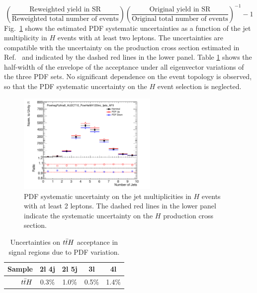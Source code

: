 \begin{equation} \label{equation:systematics_PDFunc}
\left(\frac{\textrm{Reweighted yield in SR}}{\textrm{Reweighted total number of events}}\right)\left(\frac{\textrm{Original yield in SR}}{\textrm{Original total number of events}}\right)^{-1}-1
\end{equation}
Fig.~\ref{figure:systematics_theosystPDF} shows the estimated PDF systematic uncertainties as a function of the jet multiplicity in \ttbar$H$ events with at least two leptons. The uncertainties are compatible with the uncertainty on the production cross section estimated in Ref.~\cite{Heinemeyer:2013tqa} and indicated by the dashed red lines in the lower panel. 
Table \ref{table:systematics_pdfaccttH} shows the half-width of the envelope of the acceptance under all eigenvector variations of the three PDF sets.
No significant dependence on the event topology is observed, so that the PDF systematic uncertainty on the \ttbar$H$ event selection is neglected.
\begin{figure}[htbp]
\begin{center}
\includegraphics[width=0.6\textwidth]{figs/tth/plot_PowhegPythia8_AU2CT10_PowHelttH120inc_ljets_AFII_njets_all_njets_all}
\caption{PDF systematic uncertainty on the jet multiplicities in \ttbar$H$ events with at least 2 leptons. The dashed red lines in the lower panel indicate the systematic uncertainty on the \ttbar$H$ production cross section.}
\label{figure:systematics_theosystPDF}
\end{center}
\end{figure}

\begin{table}
\begin{center}
\caption{\label{table:systematics_pdfaccttH}Uncertainties on $t\bar{t} H$ acceptance in signal
  regions due to PDF variation.}
\begin{tabular}{r|c|c|c|c}
Sample & 2l 4j & 2l 5j & 3l & 4l\\
\hline
$t\bar{t} H$ & 0.3\% & 1.0\% & 0.5\% & 1.4\%\\
\end{tabular}
\end{center}
\end{table}



